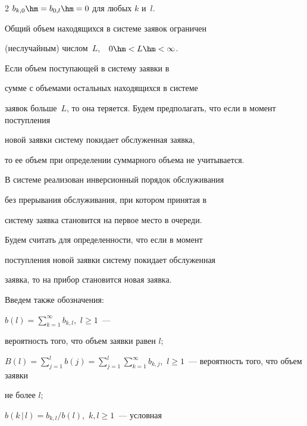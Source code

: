 \begin{multicols}{2}
$b_{k,0}\hm=b_{0,l}\hm=0$ для любых $k$ и~$l$.





Общий объем находящихся в системе заявок ограничен


(неслучайным) числом~$L$,\ \ $0\hm<L\hm<\infty$.


Если объем поступающей в систему заявки в


сумме с объемами остальных находящихся в сис\-те\-ме


заявок больше~$L$, то она теряется. Будем предполагать, что если в момент поступления


новой заявки систему покидает обслуженная заявка, 


то ее объем при определении суммарного объема не учитывается.





В системе реализован инверсионный порядок обслуживания


без прерывания обслуживания, при котором принятая в


сис\-те\-му заявка становится на первое место в очереди.


Будем считать для определенности, что если в момент


поступления новой заявки сис\-те\-му покидает обслуженная


заявка, то на прибор становится новая заявка.





Введем также обозначения:





\noindent


$b(l)=\sum\limits_{k=1}^\infty b_{k,l}$,\  $l\ge 1$~---


вероятность того, что объем заявки равен $l$;





\noindent


$B(l)=\sum\limits_{j=1}^l b(j) =


\sum\limits_{j=1}^l \sum\limits_{k=1}^\infty b_{k,j}


$,\  $l\ge 1$~--- вероятность того, что объем заявки


не более $l$;





\noindent


$b(k\,|\,l)=b_{k,l}/b(l)$,\ $k,l\ge 1$~--- условная



\end{multicols}
